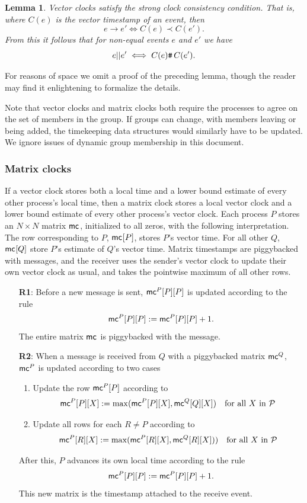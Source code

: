 \documentclass[]             %
{NASA}                       %
\newtheorem{lemma}[theorem]{Lemma}
\theoremstyle{definition}
\begin{document}
\begin{lemma}
  Vector clocks satisfy the strong clock consistency condition. That
  is, where $C(e)$ is the vector timestamp of an event, then
  \[ e \to e' \iff C(e) \prec C(e'). \]
  From this it follows that for non-equal events $e$ and $e'$ we have
  \[e || e' \iff {C(e) \texttt{\#}\,C(e')}. \]%
\end{lemma}

For reasons of space we omit a proof of the preceding lemma, though
the reader may find it enlightening to formalize the details.

Note that vector clocks and matrix clocks both require the processes
to agree on the set of members in the group. If groups can change,
with members leaving or being added, the timekeeping data structures
would similarly have to be updated. We ignore issues of dynamic group
membership in this document.

\subsubsection{Matrix clocks}
\label{sssec:matrix-clocks}
If a vector clock stores both a local time and a lower bound estimate
of every other process's local time, then a matrix clock stores a
local vector clock and a lower bound estimate of every other process's
vector clock. Each process $P$ stores an $N\times{}N$ matrix
$\mathsf{mc}^{}{}{}$, initialized to all zeros, with the following
interpretation. The row corresponding to $P$, $\mathsf{mc}^{}{[P]}{}$,
stores $P$'s vector time. For all other $Q$, $\mathsf{mc}^{}{[Q]}{}$ store $P$'s
estimate of $Q$'s vector time. Matrix timestamps are piggybacked
with messages, and the receiver uses the sender's vector clock to
update their own vector clock as usual, and takes the pointwise
maximum of all other rows.

\begin{enumerate}
\item[\textbf{R1}:] Before a new message is sent, $\mathsf{mc}^{P}{[P]}{[P]}$ is updated according to the rule
  \[\mathsf{mc}^{P}{[P]}{[P]} := \mathsf{mc}^{P}{[P]}{[P]} + 1.\]
  The entire matrix $\mathsf{mc}^{}{}{}$ is piggybacked with the message.
\item[\textbf{R2}:] When a message is received from $Q$ with a piggybacked matrix $\mathsf{mc}^{Q}{}{}$,
  $\mathsf{mc}^{P}{}{}$ is updated according to two cases
  \begin{enumerate}
  \item Update the row $\mathsf{mc}^{P}{[P]}{}$ according to
    \[\mathsf{mc}^{P}{[P]}{[X]}:= \max( \mathsf{mc}^{P}{[P]}{[X]} ,  \mathsf{mc}^{Q}{[Q]}{[X]}) \quad \textrm{for all $X$ in $\mathcal{P}$}\]
  \item Update all rows for each $R \neq P$ according to
    \[\mathsf{mc}^{P}{[R]}{[X]} := \max(\mathsf{mc}^{P}{[R]}{[X]} ,  \mathsf{mc}^{Q}{[R]}{[X]})) \quad \textrm{for all $X$ in $\mathcal{P}$}\]
  \end{enumerate}
  After this, $P$ advances its own local time according to the rule
  \[ \mathsf{mc}^{P}{[P]}{[P]} := \mathsf{mc}^{P}{[P]}{[P]} + 1.\]
  This new matrix is the timestamp attached to the receive event.
\end{enumerate}
\end{document}
